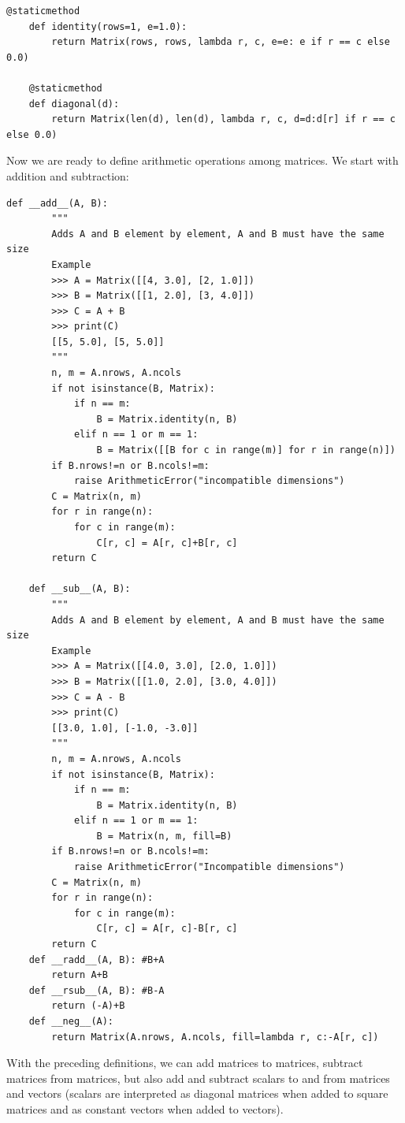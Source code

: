 \documentclass[justified, sixbynine]{tufte-book}
\def\ft{\small\tt}
\theoremstyle{plain}%
\newtheorem * {corollary}{Corollary}
\theoremstyle{definition}
\theoremstyle{remark}
\newtheorem * {remark}{Remark}
\newtheorem * {note}{Note}
\begin{document}
\begin{fullwidth}
\begin{lstlisting}[caption={in file: {\ft nlib.py}}]
    @staticmethod
    def identity(rows=1, e=1.0):
        return Matrix(rows, rows, lambda r, c, e=e: e if r == c else 0.0)

    @staticmethod
    def diagonal(d):
        return Matrix(len(d), len(d), lambda r, c, d=d:d[r] if r == c else 0.0)
\end{lstlisting}

Now we are ready to define arithmetic operations among matrices. We start with addition and subtraction:


\begin{lstlisting}[caption={in file: {\ft nlib.py}}]
    def __add__(A, B):
        """
        Adds A and B element by element, A and B must have the same size
        Example
        >>> A = Matrix([[4, 3.0], [2, 1.0]])
        >>> B = Matrix([[1, 2.0], [3, 4.0]])
        >>> C = A + B
        >>> print(C)
        [[5, 5.0], [5, 5.0]]
        """
        n, m = A.nrows, A.ncols
        if not isinstance(B, Matrix):
            if n == m:
                B = Matrix.identity(n, B)
            elif n == 1 or m == 1:
                B = Matrix([[B for c in range(m)] for r in range(n)])
        if B.nrows!=n or B.ncols!=m:
            raise ArithmeticError("incompatible dimensions")
        C = Matrix(n, m)
        for r in range(n):
            for c in range(m):
                C[r, c] = A[r, c]+B[r, c]
        return C

    def __sub__(A, B):
        """
        Adds A and B element by element, A and B must have the same size
        Example
        >>> A = Matrix([[4.0, 3.0], [2.0, 1.0]])
        >>> B = Matrix([[1.0, 2.0], [3.0, 4.0]])
        >>> C = A - B
        >>> print(C)
        [[3.0, 1.0], [-1.0, -3.0]]
        """
        n, m = A.nrows, A.ncols
        if not isinstance(B, Matrix):
            if n == m:
                B = Matrix.identity(n, B)
            elif n == 1 or m == 1:
                B = Matrix(n, m, fill=B)
        if B.nrows!=n or B.ncols!=m:
            raise ArithmeticError("Incompatible dimensions")
        C = Matrix(n, m)
        for r in range(n):
            for c in range(m):
                C[r, c] = A[r, c]-B[r, c]
        return C
    def __radd__(A, B): #B+A
        return A+B
    def __rsub__(A, B): #B-A
        return (-A)+B
    def __neg__(A):
        return Matrix(A.nrows, A.ncols, fill=lambda r, c:-A[r, c])
\end{lstlisting}
With the preceding definitions, we can add matrices to matrices, subtract matrices from matrices, but also add and subtract scalars to and from matrices and vectors
(scalars are interpreted as diagonal matrices when added to square matrices and as constant vectors when added to vectors).


\end{fullwidth}
\end{document}
